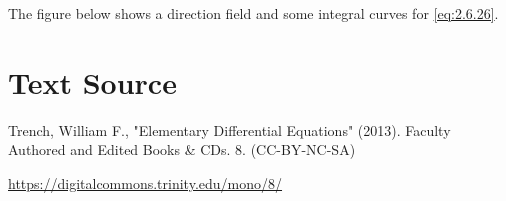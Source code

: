 \documentclass{ximera}
\begin{document}
\begin{example}
The figure below shows a direction field and some integral curves
 for \eqref{eq:2.6.26}.

\begin{center}
\end{center}
 

\end{example}

\section*{Text Source}
Trench, William F., "Elementary Differential Equations" (2013). Faculty Authored and Edited Books \& CDs. 8. (CC-BY-NC-SA)

\href{https://digitalcommons.trinity.edu/mono/8/}{https://digitalcommons.trinity.edu/mono/8/}
\end{document}
